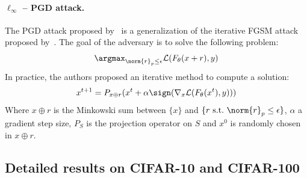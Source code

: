 \paragraph{$\ell_\infty$ -- PGD attack.}
The PGD attack proposed by~\citet{madry2018towards} is a generalization of the iterative FGSM attack proposed by~\citet{kurakin2016adversarial}. The goal of the adversary is to solve the following problem:
$$\argmax_{\norm{r}_p \leq \epsilon} \mathcal{L}(F_{\theta}(x+r),y) $$
In practice, the authors proposed an iterative method to compute a solution:
$$x^{t+1}=P_{x \oplus r}(x^t+\alpha \sign (\nabla_x\mathcal{L}(F_\theta(x^t),y)))$$
Where $x \oplus r$ is the Minkowski sum between $\{x\}$ and $\{r \text{~s.t.~} \norm{r}_p \leq \epsilon\}$, $\alpha$ a gradient step size, $P_S$ is the projection operator on $S$ and $x^0$ is randomly chosen in $x \oplus r$. 

\subsection{Detailed results on CIFAR-10 and CIFAR-100}

